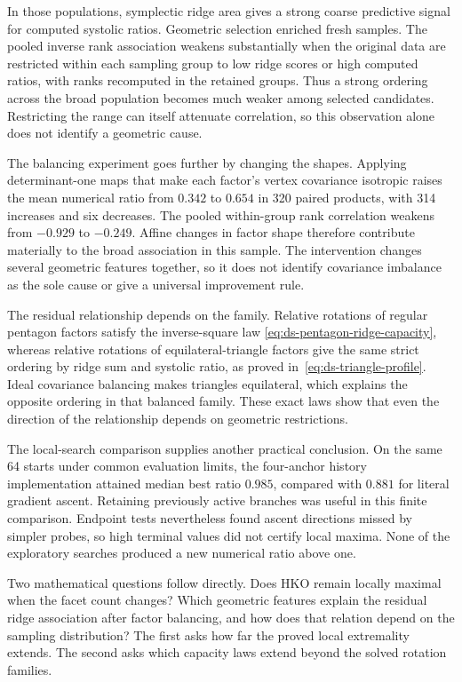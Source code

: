 In those populations, symplectic ridge area gives a strong coarse predictive
signal for computed systolic ratios. Geometric selection enriched fresh
samples. The pooled inverse rank association weakens substantially when the
original data are restricted within each sampling group to low ridge scores
or high computed ratios, with ranks recomputed in the retained groups.
Thus a strong ordering across the broad population becomes much weaker
among selected candidates. Restricting the range can itself attenuate
correlation, so this observation alone does not identify a geometric cause.

The balancing experiment goes further by changing the shapes. Applying
determinant-one maps that make each factor's vertex covariance isotropic
raises the mean numerical ratio from $0.342$ to $0.654$ in 320 paired
products, with 314 increases and six decreases. The pooled within-group
rank correlation weakens from $-0.929$ to $-0.249$. Affine changes in factor
shape therefore contribute materially to the broad association in this
sample. The intervention changes several geometric features together, so
it does not identify covariance imbalance as the sole cause or give a
universal improvement rule.

The residual relationship depends on the family. Relative rotations of
regular pentagon factors satisfy the inverse-square law
\eqref{eq:ds-pentagon-ridge-capacity}, whereas relative rotations of
equilateral-triangle factors give the same strict ordering by ridge sum and
systolic ratio, as proved in~\eqref{eq:ds-triangle-profile}. Ideal covariance
balancing makes triangles equilateral, which explains the opposite ordering
in that balanced family. These exact laws show that even the direction of
the relationship depends on geometric restrictions.

The local-search comparison supplies another practical conclusion. On the
same 64 starts under common evaluation limits, the four-anchor history
implementation attained median best ratio $0.985$, compared with $0.881$
for literal gradient ascent. Retaining previously active branches was useful
in this finite comparison. Endpoint tests nevertheless found ascent
directions missed by simpler probes, so high terminal values did not certify
local maxima. None of the exploratory searches produced a new numerical
ratio above one.

Two mathematical questions follow directly. Does HKO remain locally maximal
when the facet count changes? Which geometric features explain the residual
ridge association after factor balancing, and how does that relation depend
on the sampling distribution? The
first asks how far the proved local extremality extends. The second asks
which capacity laws extend beyond the solved rotation families.
